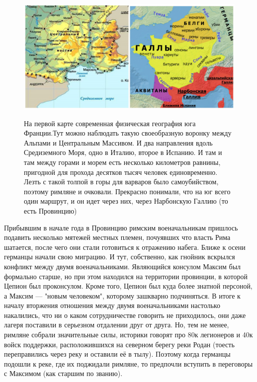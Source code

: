 \begin{figure}[h!tb]
	\centering\includegraphics[scale=0.25]{kimres/1574757993132297819.png}
	\label{fig:kimr2} %
	\caption{На первой карте современная физическая география юга Франции.Тут можно наблюдать такую своеобразную воронку между Альпами и Центральным Массивом. И два направления вдоль Средиземного Моря, одно в Италию, второе в Испанию. И там и там между горами и морем есть несколько километров равнины, пригодной для прохода десятков тысяч человек единовременно. Лезть с такой толпой в горы для варваров было самоубийством, поэтому римляне и очковали. Прекрасно понимали, что на юг всего один маршрут, и он идет через них, через Нарбонскую Галлию (то есть Провинцию)}
\end{figure}


Прибывшим в начале года в Провинцию римским военачальникам пришлось подавить несколько мятежей местных племен, почуявших что власть Рима шатается, после чего они стали готовиться к отражению набега. Ближе к осени германцы начали свою миграцию. И тут, собственно, как гнойник вскрылся конфликт между двумя военачальниками. Являющийся консулом Максим был формально старше, но при этом находился на территории провинции, в которой Цепион был проконсулом. Кроме того, Цепион был куда более знатной персоной, а Максим — "новым человеком", которому зашкварно подчиняться. В итоге к началу вторжения отношения между двумя военачальниками настолько накалились, что ни о каком сотрудничестве говорить не приходилось, они даже лагеря поставили в серьезном отдалении друг от друга. Но, тем не менее, римляне собрали значительные силы, историки говорят про 80к легионеров и 40к войск поддержки, расположившихся на северном берегу реки Родан (тоесть переправились через реку и оставили её в тылу). Поэтому когда германцы подошли к реке, где их поджидали римляне, то предпочли вступить в переговоры с Максимом (как старшим по званию).


